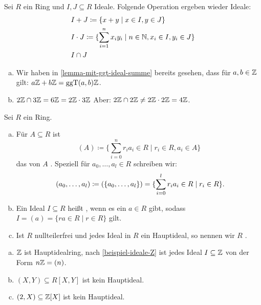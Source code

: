\begin{bemerkung}
  Sei \(R\) ein Ring und \(I,J\subseteq R\) Ideale.
  Folgende Operation ergeben wieder Ideale:
  \begin{align*}
    & I+J\coloneq \{x+y\mid x\in I, y\in J\} \\
    & I\cdot J\coloneq \{\sum_{i=1}^nx_iy_i\mid n\in\mathbb{N},x_i\in I, y_i\in J \} \\
    & I\cap J    
  \end{align*}
\end{bemerkung}

\begin{beispiel}
  \begin{enumerate}[(a)]
  \item Wir haben in \ref{lemma-mit-ggt-ideal-summe} bereits gesehen, dass für \(a,b\in \mathbb{Z}\) gilt: \(a\mathbb{Z}+b\mathbb{Z}=\mathrm{ggT}(a,b)\mathbb{Z}\).
  \item \(2\mathbb{Z}\cap 3\mathbb{Z}=6\mathbb{Z}=2\mathbb{Z}\cdot 3\mathbb{Z}\) Aber:
    \(2\mathbb{Z}\cap 2\mathbb{Z} \neq 2\mathbb{Z}\cdot 2\mathbb{Z}=4\mathbb{Z}\).
  \end{enumerate}
\end{beispiel}

\begin{definition}
  Sei \(R\) ein Ring.
  \begin{enumerate}[(a)]
  \item Für \(A\subseteq R\) ist
    \[
      (A)\coloneq \{\sum_{i=0}^nr_ia_i\in R\mid r_i\in R, a_i\in A\}
    \]
    das von \(A\) . Speziell für \(a_0,\dots,a_l\in R\) schreiben wir:
    \[
      (a_0,\dots,a_l)\coloneq (\{a_0,\dots,a_l\})=\{\sum_{i=0}^lr_ia_i\in R\mid r_i\in R\}\rlap{.}
    \]
  \item Ein Ideal \(I\subseteq R\) heißt , wenn es ein \(a\in R\) gibt, sodass \(I=(a)=\{ra\in R\mid r\in R\}\) gilt.
  \item Ist \(R\) nullteilerfrei und jedes Ideal in \(R\) ein Hauptideal, so nennen wir \(R\) .
  \end{enumerate}
\end{definition}

\begin{beispiel}
  \begin{enumerate}[(a)]
  \item \(\mathbb{Z}\) ist Hauptidealring, nach \ref{beispiel-ideale-Z} ist jedes Ideal \(I\subseteq \mathbb{Z}\) von der Form \(n\mathbb{Z}=(n)\).
  \item \((X,Y)\subseteq R[X,Y]\) ist kein Hauptideal.
  \item \((2,X)\subseteq \mathbb{Z}[X]\) ist kein Hauptideal.
  \end{enumerate}
\end{beispiel}

